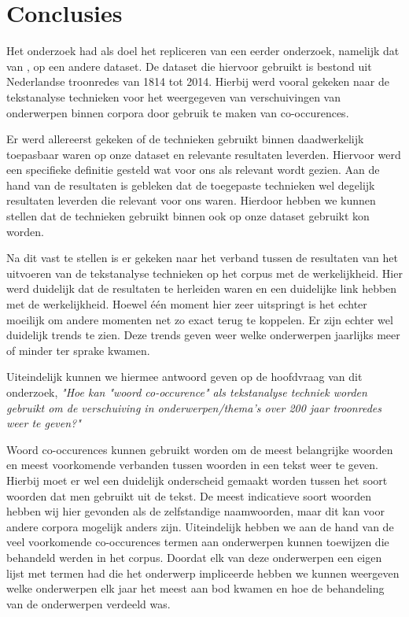 \section{Conclusies}
\label{sec:conc}

Het onderzoek had als doel het repliceren van een eerder onderzoek, namelijk dat van \cite{state}, op een andere dataset. De dataset die hiervoor gebruikt is bestond uit Nederlandse troonredes van 1814 tot 2014. Hierbij werd vooral gekeken naar de tekstanalyse technieken voor het weergegeven van verschuivingen van onderwerpen binnen corpora door gebruik te maken van co-occurences. 

Er werd allereerst gekeken of de technieken gebruikt binnen \cite{state} daadwerkelijk toepasbaar waren op onze dataset en relevante resultaten leverden. Hiervoor werd een specifieke definitie gesteld wat voor ons als relevant wordt gezien. Aan de hand van de resultaten is gebleken dat de toegepaste technieken wel degelijk resultaten leverden die relevant voor ons waren. Hierdoor hebben we kunnen stellen dat de technieken gebruikt binnen \cite{state} ook op onze dataset gebruikt kon worden.

Na dit vast te stellen is er gekeken naar het verband tussen de resultaten van het uitvoeren van de tekstanalyse technieken op het corpus met de werkelijkheid. Hier werd duidelijk dat de resultaten te herleiden waren en een duidelijke link hebben met de werkelijkheid. Hoewel één moment hier zeer uitspringt is het echter moeilijk om andere momenten net zo exact terug te koppelen. Er zijn echter wel duidelijk trends te zien. Deze trends geven weer welke onderwerpen jaarlijks meer of minder ter sprake kwamen.

Uiteindelijk kunnen we hiermee antwoord geven op de hoofdvraag van dit onderzoek, \textit{"Hoe kan "woord co-occurence" als tekstanalyse techniek worden gebruikt om de verschuiving in onderwerpen/thema’s over 200 jaar troonredes weer te geven?"}

Woord co-occurences kunnen gebruikt worden om de meest belangrijke woorden en meest voorkomende verbanden tussen woorden in een tekst weer te geven. Hierbij moet er wel een duidelijk onderscheid gemaakt worden tussen het soort woorden dat men gebruikt uit de tekst. De meest indicatieve soort woorden hebben wij hier gevonden als de zelfstandige naamwoorden, maar dit kan voor andere corpora mogelijk anders zijn. Uiteindelijk hebben we aan de hand van de veel voorkomende co-occurences termen aan onderwerpen kunnen toewijzen die behandeld werden in het corpus. Doordat elk van deze onderwerpen een eigen lijst met termen had die het onderwerp impliceerde hebben we kunnen weergeven welke onderwerpen elk jaar het meest aan bod kwamen en hoe de behandeling van de onderwerpen verdeeld was.  

